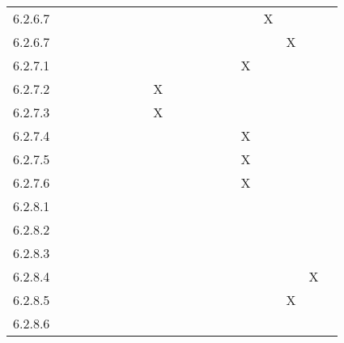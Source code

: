 \documentclass[12pt, titlepage]{article}
\begin{document}
\begin{tabular}{|c|c|c|c|c|c|c|c|c|c|c|c|c|c|c|c|c|c|c|}
     6.2.6.7 & & & & & & & & & & & & & & &X & & & \\
     6.2.6.7 & & & & & & & & & & & & & & & &X & & \\
     6.2.7.1 & & & & & & & & & & & & & &X & & & & \\
     6.2.7.2 & & & & & & & &X & & & & & & & & & & \\
     6.2.7.3 & & & & & & & &X & & & & & & & & & & \\
     6.2.7.4 & & & & & & & & & & & & & &X & & & & \\
     6.2.7.5 & & & & & & & & & & & & & &X & & & & \\
     6.2.7.6 & & & & & & & & & & & & & &X & & & & \\
     6.2.8.1 & & & & & & & & & & & & & & & & & & \\
     6.2.8.2 & & & & & & & & & & & & & & & & & & \\
     6.2.8.3 & & & & & & & & & & & & & & & & & & \\
     6.2.8.4 & & & & & & & & & & & & & & & & &X & \\
     6.2.8.5 & & & & & & & & & & & & & & & &X & & \\
     6.2.8.6 & & & & & & & & & & & & & & & & & & \\
     \hline
\end{tabular}
\end{document}
